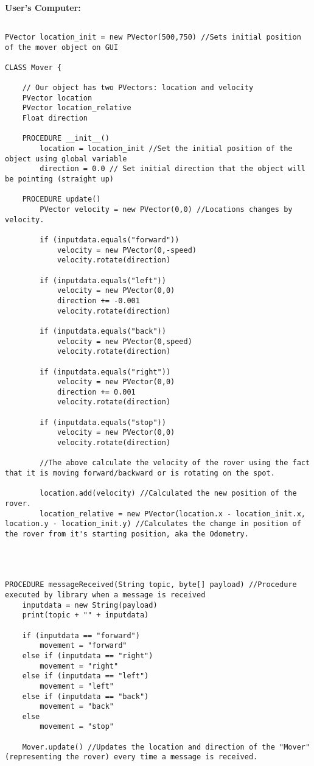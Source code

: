 \documentclass[11pt]{report}
\begin{document}
\noindent
\\
\textbf{User's Computer:}
\begin{lstlisting}

PVector location_init = new PVector(500,750) //Sets initial position of the mover object on GUI

CLASS Mover {

	// Our object has two PVectors: location and velocity
	PVector location
	PVector location_relative
	Float direction
	
	PROCEDURE __init__() 
		location = location_init //Set the initial position of the object using global variable
		direction = 0.0 // Set initial direction that the object will be pointing (straight up)
		
	PROCEDURE update() 
    	PVector velocity = new PVector(0,0) //Locations changes by velocity.

    	if (inputdata.equals("forward")) 
	    	velocity = new PVector(0,-speed)
	    	velocity.rotate(direction)

    	if (inputdata.equals("left")) 
			velocity = new PVector(0,0)
			direction += -0.001
			velocity.rotate(direction)
    
    	if (inputdata.equals("back")) 
			velocity = new PVector(0,speed)
			velocity.rotate(direction)
    
		if (inputdata.equals("right")) 
			velocity = new PVector(0,0)
			direction += 0.001
			velocity.rotate(direction)
    
		if (inputdata.equals("stop")) 
			velocity = new PVector(0,0)
			velocity.rotate(direction)
      
    	//The above calculate the velocity of the rover using the fact that it is moving forward/backward or is rotating on the spot.
    
    	location.add(velocity) //Calculated the new position of the rover.
    	location_relative = new PVector(location.x - location_init.x, location.y - location_init.y) //Calculates the change in position of the rover from it's starting position, aka the Odometry.




PROCEDURE messageReceived(String topic, byte[] payload) //Procedure executed by library when a message is received
	inputdata = new String(payload)
	print(topic + "" + inputdata)
	
	if (inputdata == "forward") 
   	 	movement = "forward"
   	else if (inputdata == "right") 
   	 	movement = "right"
   	else if (inputdata == "left") 
   		movement = "left"
   	else if (inputdata == "back") 
   		movement = "back"
   	else 
   		movement = "stop"
   		
   	Mover.update() //Updates the location and direction of the "Mover" (representing the rover) every time a message is received.
  
\end{lstlisting}
\end{document}
